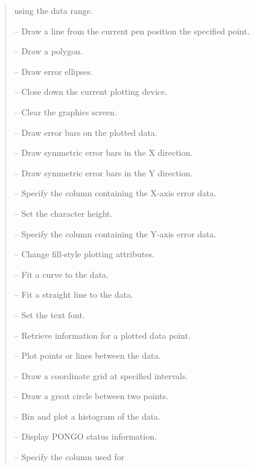 \documentclass[twoside,11pt]{article}
\newcommand{\htmlref}[2]{#1}
\renewcommand{\_}{\texttt{\symbol{95}}}
\newcommand{\iref} [1]{\htmlref{#1}{#1}}
\newcommand{\iiref}[2]{\htmlref{#1}{#2}}
\begin{document}
\begin {quote}
\begin {description}
                                             using the data range.
\item [\iref{DRAW}] -- Draw a line from the current pen position the specified
                       point.
\item [\iref{DRAWPOLY}] -- Draw a polygon.
\item [\iref{ELLIPSES}] -- Draw error ellipses.
\item [\iiref{ENDP(LOT)}{ENDPLOT}] -- Close down the current plotting device.
\item [\iref{ERASE}] -- Clear the graphics screen.
\item [\iref{ERRORBAR}] -- Draw error bars on the plotted data.
\item [\iref{ERRX}] -- Draw symmetric error bars in the X direction.
\item [\iref{ERRY}] -- Draw symmetric error bars in the Y direction.
\item [\iiref{EXC(OLUMN)}{EXCOLUMN}] -- Specify the column containing
                                        the X-axis error data.
\item [\iiref{EXPA(ND)}{EXPAND}] -- Set the character height.
\item [\iiref{EYC(OLUMN)}{EYCOLUMN}] -- Specify the column containing
                                        the Y-axis error data.
\item [\iref{FILLSTY}] -- Change fill-style plotting attributes.
\item [\iiref{FITC(URVE)}{FITCURVE}] -- Fit a curve to the data.
\item [\iiref{FITL(INE)}{FITLINE}] -- Fit a straight line to the data.
\item [\iref{FONT}] -- Set the text font.
\item [\iiref{GETP(OINT)}{GETPOINT}] -- Retrieve information for a
                                        plotted data point.
\item [\iref{GPOINTS}] -- Plot points or lines between the data.
\item [\iref{GRID}] -- Draw a coordinate grid at specified intervals.
\item [\iref{GT\_CIRCLE}] -- Draw a great circle between two points.
\item [\iiref{HIST(OGRAM)}{HISTOGRAM}] -- Bin and plot a histogram of
                                          the data.
\item [\iiref{INQ(UIRE)}{INQUIRE}] -- Display PONGO status information.
\item [\iiref{LABC(OLUMN)}{LABCOLUMN}] -- Specify the column used for

\end{description}
\end{quote}
\end{document}
